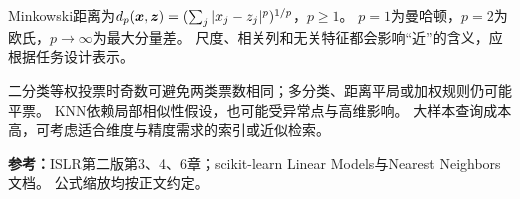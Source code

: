 Minkowski距离为$d_p(\boldsymbol{x},\boldsymbol{z})=(\sum_j|x_j-z_j|^p)^{1/p}$，$p\geq1$。
$p=1$为曼哈顿，$p=2$为欧氏，$p\to\infty$为最大分量差。
尺度、相关列和无关特征都会影响“近”的含义，应根据任务设计表示。

\begin{pitfall}[奇数$k$并不消除所有平票]
二分类等权投票时奇数可避免两类票数相同；多分类、距离平局或加权规则仍可能平票。
KNN依赖局部相似性假设，也可能受异常点与高维影响。
大样本查询成本高，可考虑适合维度与精度需求的索引或近似检索。
\end{pitfall}

\begingroup\small
\noindent\textbf{参考：}ISLR第二版第3、4、6章；scikit-learn Linear Models与Nearest Neighbors文档。
公式缩放均按正文约定。
\par\endgroup
